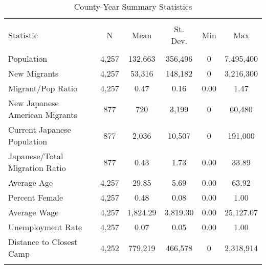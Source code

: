 
\begin{table}[!h] \centering 
  \caption{County-Year Summary Statistics} 
  \label{ctysumstats} 
\begin{tabular}{@{\extracolsep{5pt}}lccccc} 
\\[-1.8ex]\hline 
\hline \\[-1.8ex] 
Statistic & \multicolumn{1}{c}{N} & \multicolumn{1}{c}{Mean} & \multicolumn{1}{c}{St. Dev.} & \multicolumn{1}{c}{Min} & \multicolumn{1}{c}{Max} \\ 
\hline \\[-1.8ex] 
Population & 4,257 & 132,663 & 356,496 & 0 & 7,495,400 \\ 
New Migrants & 4,257 & 53,316 & 148,182 & 0 & 3,216,300 \\ 
Migrant/Pop Ratio & 4,257 & 0.47 & 0.16 & 0.00 & 1.47 \\ 
New Japanese American Migrants & 877 & 720 & 3,199 & 0 & 60,480 \\ 
Current Japanese Population & 877 & 2,036 & 10,507 & 0 & 191,000 \\ 
Japanese/Total Migration Ratio & 877 & 0.43 & 1.73 & 0.00 & 33.89 \\ 
Average Age & 4,257 & 29.85 & 5.69 & 0.00 & 63.92 \\ 
Percent Female & 4,257 & 0.48 & 0.08 & 0.00 & 1.00 \\ 
Average Wage & 4,257 & 1,824.29 & 3,819.30 & 0.00 & 25,127.07 \\ 
Unemployment Rate & 4,257 & 0.07 & 0.05 & 0.00 & 1.00 \\ 
Distance to Closest Camp & 4,252 & 779,219 & 466,578 & 0 & 2,318,914\\ 
\hline \\[-1.8ex] 
\end{tabular} 
\end{table} 

